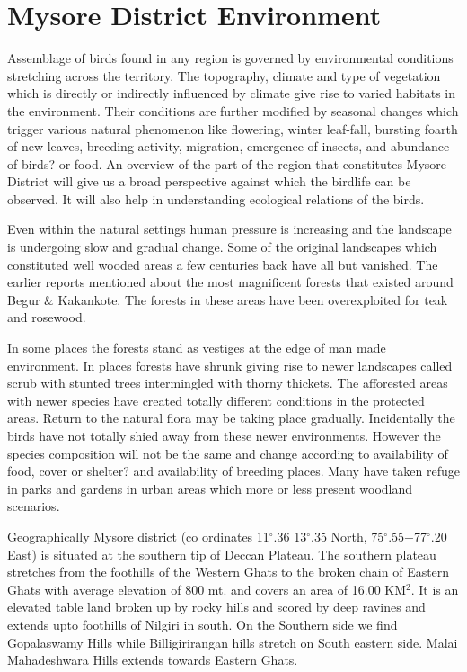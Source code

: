 \chapter{Mysore District Environment}%

Assemblage of birds found in any region is governed by 
environmental conditions stretching across the territory. The 
topography, climate and type of vegetation which is directly or 
indirectly influenced by climate give rise to varied habitats in 
the environment. Their conditions are further modified by seasonal 
changes which trigger various natural phenomenon like flowering, 
winter leaf-fall, bursting foarth of new leaves, breeding 
activity, migration, emergence of insects, and abundance of 
birds? or food. An overview of the part of the region that constitutes 
Mysore District will give us a broad perspective against which 
the birdlife can be observed. It will also help in understanding 
ecological relations of the birds. 

\vskip 0.2cm

Even within the natural settings human pressure is increasing 
and the landscape is undergoing slow and gradual change. Some 
of the original landscapes which constituted well wooded areas a 
few centuries back have all but vanished. The earlier reports 
mentioned about the most magnificent forests that existed around 
Begur \& Kakankote. The forests in these areas have been overexploited 
for teak and rosewood. 

\vskip 0.2cm

In some places the forests stand as vestiges at the edge of 
man made environment. In places forests have shrunk giving rise 
to newer landscapes called scrub with stunted trees intermingled 
with thorny thickets. The afforested areas with newer species 
have created totally different conditions in the protected areas. 
Return to the natural flora may be taking place gradually. Incidentally 
the birds have not totally shied away from these newer 
environments. However the species composition will not be the 
same and change according to availability of food, cover or shelter? and 
availability of breeding places. Many have taken refuge in parks 
and gardens in urban areas which more or less present woodland 
scenarios. 

\vskip 0.2cm

Geographically Mysore district (co ordinates 11$^\circ$.36 13$^\circ$.35 
North, 75$^\circ$.55$-$77$^\circ$.20 East) is situated at the southern tip of 
Deccan Plateau. The southern plateau stretches from the foothills 
of the Western Ghats to the broken chain of Eastern Ghats with 
average elevation of 800 mt. and covers an area of 16.00 KM$^2$. It 
is an elevated table land broken up by rocky hills and scored by 
deep ravines and extends upto foothills of Nilgiri in south. On 
the Southern side we find Gopalaswamy Hills while Billigirirangan 
hills stretch on South eastern side. Malai Mahadeshwara Hills 
extends towards Eastern Ghats. 

